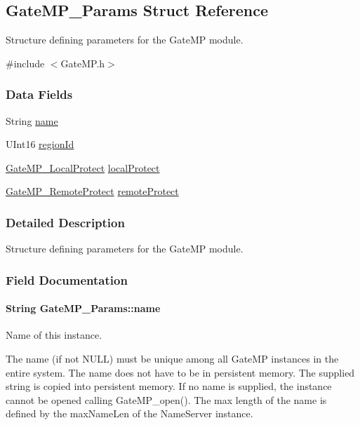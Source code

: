 \subsection{Gate\-M\-P\-\_\-\-Params Struct Reference}
\label{struct_gate_m_p___params}


Structure defining parameters for the Gate\-M\-P module.  




{\ttfamily \#include $<$Gate\-M\-P.\-h$>$}

\subsubsection*{Data Fields}
\begin{DoxyCompactItemize}
\item 
String \hyperlink{struct_gate_m_p___params_a159f61c6e36fe603775dc4840121969b}{name}
\item 
U\-Int16 \hyperlink{struct_gate_m_p___params_a5af9a96f1fcf6f29b69c07207a33d453}{region\-Id}
\item 
\hyperlink{_gate_m_p_8h_a3877bd64627d7449d3687e8b06939652}{Gate\-M\-P\-\_\-\-Local\-Protect} \hyperlink{struct_gate_m_p___params_ac080433fff177b3d5b1cd5dcafc9e28c}{local\-Protect}
\item 
\hyperlink{_gate_m_p_8h_a88716d5706d8fa8c6a3b9a4f023ef1d8}{Gate\-M\-P\-\_\-\-Remote\-Protect} \hyperlink{struct_gate_m_p___params_a32a1870109d6aa6f583932aff19ebb50}{remote\-Protect}
\end{DoxyCompactItemize}


\subsubsection{Detailed Description}
Structure defining parameters for the Gate\-M\-P module. 

\subsubsection{Field Documentation}
\paragraph[{name}]{\setlength{\rightskip}{0pt plus 5cm}String Gate\-M\-P\-\_\-\-Params\-::name}\label{struct_gate_m_p___params_a159f61c6e36fe603775dc4840121969b}
Name of this instance. \begin{DoxyVerb}   The name (if not NULL) must be unique among all GateMP instances
   in the entire system.  The name does not have to be in persistent
   memory.  The supplied string is copied into persistent memory.
   If no name is supplied, the instance cannot be opened calling
   GateMP_open().  The max length of the name is defined by the
   maxNameLen of the NameServer instance.\end{DoxyVerb}
